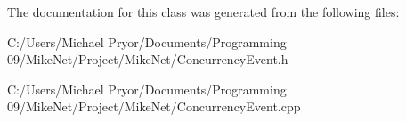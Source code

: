 The documentation for this class was generated from the following files:\begin{DoxyCompactItemize}
\item 
C:/Users/Michael Pryor/Documents/Programming 09/MikeNet/Project/MikeNet/ConcurrencyEvent.h\item 
C:/Users/Michael Pryor/Documents/Programming 09/MikeNet/Project/MikeNet/ConcurrencyEvent.cpp\end{DoxyCompactItemize}
